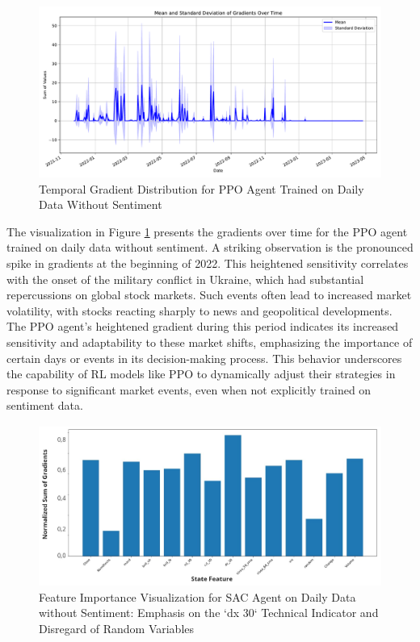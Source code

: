 \documentclass[12pt]{article}
\begin{document}
\begin{figure}[h]
\centering
\includegraphics[width=1\textwidth]{figs/DayImportance_PPO_daily_NoSentiment.pdf}
\caption{Temporal Gradient Distribution for PPO Agent Trained on Daily Data Without Sentiment}
\label{fig:DayImportance_PPO_daily_NoSentiment}
\end{figure}

The visualization in Figure \ref{fig:DayImportance_PPO_daily_NoSentiment} presents the gradients over time for the PPO agent trained on daily data without sentiment. A striking observation is the pronounced spike in gradients at the beginning of 2022. This heightened sensitivity correlates with the onset of the military conflict in Ukraine, which had substantial repercussions on global stock markets. Such events often lead to increased market volatility, with stocks reacting sharply to news and geopolitical developments. The PPO agent's heightened gradient during this period indicates its increased sensitivity and adaptability to these market shifts, emphasizing the importance of certain days or events in its decision-making process. This behavior underscores the capability of RL models like PPO to dynamically adjust their strategies in response to significant market events, even when not explicitly trained on sentiment data.

\begin{figure}[h]
\centering
\includegraphics[width=1\textwidth]{figs/FeatureImportance_SAC_daily.jpg}
\caption{Feature Importance Visualization for SAC Agent on Daily Data without Sentiment: Emphasis on the `dx 30` Technical Indicator and Disregard of Random Variables}
\label{fig:FeatureImportance_SAC_daily}
\end{figure}
\end{document}
